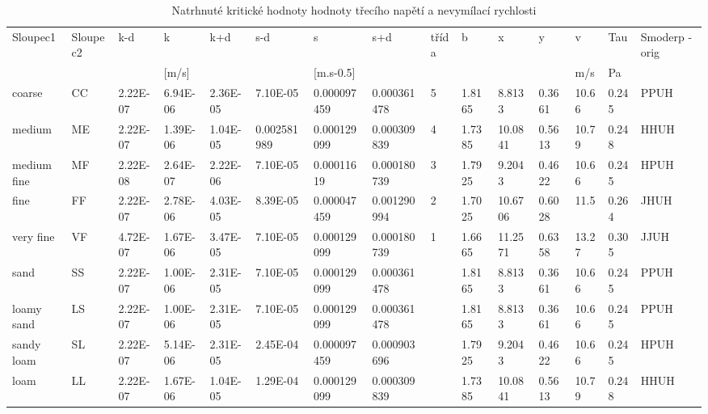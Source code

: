 \begin{sidewaystable}
% 
\centering
\caption{Natrhnuté kritické hodnoty hodnoty třecího napětí a nevymílací rychlosti }
\label{tab:kriticke}
{\small 
\begin{tabular}{lllllllllllllll}
\hline
Sloupec1        & Sloupec2 & k-d         & k         & k+d      & s-d         & s             & s+d         & třída & b      & x       & y      & v     & Tau   & Smoderp -orig \\
                &          &             & {[}m/s{]} &          &             & {[}m.s-0.5{]} &             &       &        &         &        & m/s   & Pa    &               \\
\hline \hline
coarse          & CC       & 2.22E-07    & 6.94E-06  & 2.36E-05 & 7.10E-05    & 0.000097459   & 0.000361478 & 5     & 1.8165 & 8.8133  & 0.3661 & 10.66 & 0.245 & PPUH          \\
medium          & ME       & 2.22E-07    & 1.39E-06  & 1.04E-05 & 0.002581989 & 0.000129099   & 0.000309839 & 4     & 1.7385 & 10.0841 & 0.5613 & 10.79 & 0.248 & HHUH          \\
medium fine     & MF       & 2.22E-08    & 2.64E-07  & 2.22E-06 & 7.10E-05    & 0.00011619    & 0.000180739 & 3     & 1.7925 & 9.2043  & 0.4622 & 10.66 & 0.245 & HPUH          \\
fine            & FF       & 2.22E-07    & 2.78E-06  & 4.03E-05 & 8.39E-05    & 0.000047459   & 0.001290994 & 2     & 1.7025 & 10.6706 & 0.6028 & 11.5  & 0.264 & JHUH          \\
very fine       & VF       & 4.72E-07    & 1.67E-06  & 3.47E-05 & 7.10E-05    & 0.000129099   & 0.000180739 & 1     & 1.6665 & 11.2571 & 0.6358 & 13.27 & 0.305 & JJUH          \\
sand            & SS       & 2.22E-07    & 1.00E-06  & 2.31E-05 & 7.10E-05    & 0.000129099   & 0.000361478 &       & 1.8165 & 8.8133  & 0.3661 & 10.66 & 0.245 & PPUH          \\
loamy sand      & LS       & 2.22E-07    & 1.00E-06  & 2.31E-05 & 7.10E-05    & 0.000129099   & 0.000361478 &       & 1.8165 & 8.8133  & 0.3661 & 10.66 & 0.245 & PPUH          \\
sandy loam      & SL       & 2.22E-07    & 5.14E-06  & 2.31E-05 & 2.45E-04    & 0.000097459   & 0.000903696 &       & 1.7925 & 9.2043  & 0.4622 & 10.66 & 0.245 & HPUH          \\
loam            & LL       & 2.22E-07    & 1.67E-06  & 1.04E-05 & 1.29E-04    & 0.000129099   & 0.000309839 &       & 1.7385 & 10.0841 & 0.5613 & 10.79 & 0.248 & HHUH          \\

\end{tabular}}
\end{sidewaystable}
